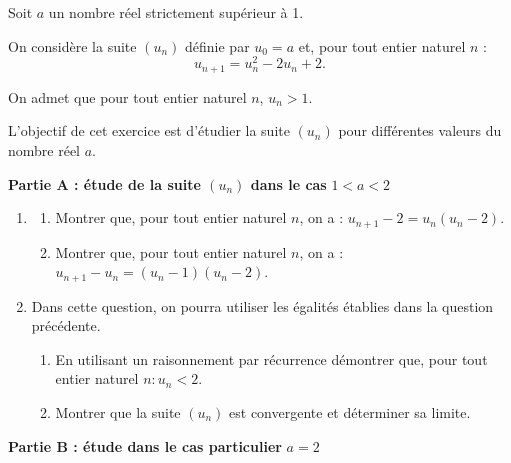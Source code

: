 \medskip

Soit $a$ un nombre réel strictement supérieur à 1.

On considère la suite $\left(u_n\right)$ définie par $u_0 = a$ et, pour tout entier naturel $n$ : \[u_{n+1} = u_n^2 - 2u_n + 2.\]

On admet que pour tout entier naturel $n$,\: $u_n > 1$.

L'objectif de cet exercice est d'étudier la suite $\left(u_n\right)$ pour différentes valeurs du nombre réel $a$.

\bigskip

\textbf{Partie A : étude de la suite \boldmath $\left(u_n\right)$ \unboldmath dans le cas }\boldmath$1 < a < 2$\unboldmath 

\medskip

\begin{enumerate}
\item 
	\begin{enumerate}
		\item Montrer que, pour tout entier naturel $n$, on a : $u_{n+1} - 2 = u_n\left(u_n - 2\right)$.
		\item Montrer que, pour tout entier naturel $n$, on a : $u_{n+1} - u_n = \left(u_n - 1\right)\left(u_n - 2\right)$.
	\end{enumerate}
\item Dans cette question, on pourra utiliser les égalités établies dans la question précédente.
	\begin{enumerate}
		\item En utilisant un raisonnement par récurrence démontrer que, pour tout entier naturel $n : u_n < 2$.
		\item Montrer que la suite $\left(u_n\right)$ est convergente et déterminer sa limite. 
	\end{enumerate}
\end{enumerate}
	
	
\textbf{Partie B : étude dans le cas particulier }\boldmath $a = 2$\unboldmath

\medskip

